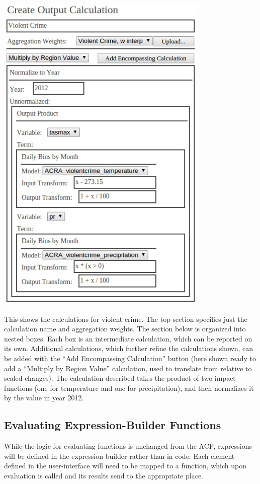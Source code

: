\documentclass[12pt, oneside]{amsart}
\begin{document}
\includegraphics[width=4in]{wireframe.png}

This shows the calculations for violent crime.  The top section specifies just the calculation name and aggregation weights.  The section below is organized into nested boxes.  Each box is an intermediate calculation, which can be reported on its own.  Additional calculations, which further refine the calculations shown, can be added with the ``Add Encompassing Calculation'' button (here shown ready to add a ``Multiply by Region Value'' calculation, used to translate from relative to scaled changes).  The calculation described takes the product of two impact functions (one for temperature and one for precipitation), and then normalizes it by the value in year 2012.

\subsection{Evaluating Expression-Builder Functions}
\label{sec:evaluation}

While the logic for evaluating functions is unchanged from the ACP,
expressions will be defined in the expression-builder rather than in
code.  Each element defined in the user-interface will need to be
mapped to a function, which upon evaluation is called and its results
send to the appropriate place.
\end{document}
